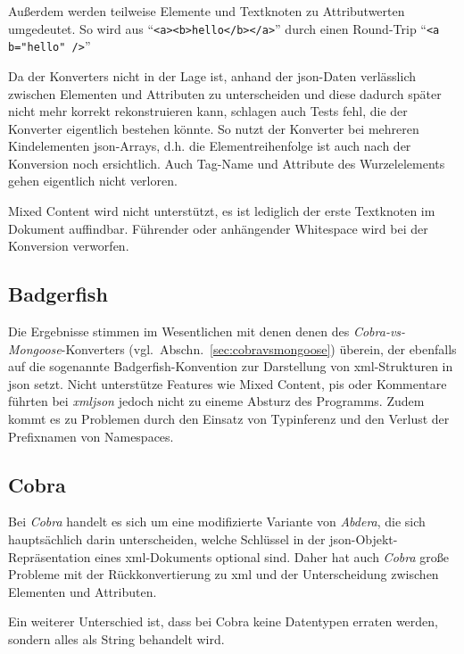 Außerdem werden teilweise Elemente und Textknoten zu Attributwerten umgedeutet. So wird aus \enquote{\texttt{<a><b>hello</b></a>}} durch einen Round-Trip \enquote{\texttt{<a b="hello" />}}

Da der Konverters nicht in der Lage ist, anhand der \acrshort{json}-Daten verlässlich zwischen Elementen und Attributen zu unterscheiden und diese dadurch später nicht mehr korrekt rekonstruieren kann, schlagen auch Tests fehl, die der Konverter eigentlich bestehen könnte. So nutzt der Konverter bei mehreren Kindelementen \acrshort{json}-Arrays, d.h. die Elementreihenfolge ist auch nach der Konversion noch ersichtlich.
Auch Tag-Name und Attribute des Wurzelelements gehen eigentlich nicht verloren.

Mixed Content wird nicht unterstützt, es ist lediglich der erste Textknoten im Dokument auffindbar.
Führender oder anhängender Whitespace wird bei der Konversion verworfen.

\subsection{Badgerfish}
\label{sec:xmljson-badgerfish}

Die Ergebnisse stimmen im Wesentlichen mit denen  denen des \emph{Cobra-vs-Mongoose}-Konverters (vgl.~Abschn.~\ref{sec:cobravsmongoose}) überein, der ebenfalls auf die sogenannte Badgerfish-Konvention zur Darstellung von \acrshort{xml}-Strukturen in \acrshort{json} setzt. Nicht unterstütze Features wie Mixed Content, \glspl{pi} oder Kommentare führten bei \emph{xmljson} jedoch nicht zu eineme Absturz des Programms. Zudem kommt es zu Problemen durch den Einsatz von Typinferenz und den Verlust der Prefixnamen von Namespaces.

\subsection{Cobra}
\label{sec:xmljson-cobra}

Bei \emph{Cobra} handelt es sich um eine modifizierte Variante von \emph{Abdera}, die sich hauptsächlich darin unterscheiden, welche Schlüssel in der \acrshort{json}-Objekt-Repräsentation eines \acrshort{xml}-Dokuments optional sind. Daher hat auch \emph{Cobra} große Probleme mit der Rückkonvertierung zu \acrshort{xml} und der Unterscheidung zwischen Elementen und Attributen.

Ein weiterer Unterschied ist, dass bei Cobra keine Datentypen erraten werden, sondern alles als String behandelt wird.

